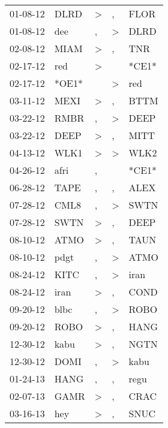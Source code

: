 \begin{supertabular}{lllll}
 01-08-12 &   DLRD &     \textgreater &                , &   FLOR \\
 01-08-12 &    dee &                , &     \textgreater &   DLRD \\
 02-08-12 &   MIAM &     \textgreater &                , &    TNR \\
 02-17-12 &    red &     \textgreater &                  &  *CE1* \\
 02-17-12 &  *OE1* &                  &     \textgreater &    red \\
 03-11-12 &   MEXI &     \textgreater &                , &   BTTM \\
 03-22-12 &   RMBR &                , &     \textgreater &   DEEP \\
 03-22-12 &   DEEP &     \textgreater &                , &   MITT \\
 04-13-12 &   WLK1 &     \textgreater &     \textgreater &   WLK2 \\
 04-26-12 &   afri &                , &                  &  *CE1* \\
 06-28-12 &   TAPE &                , &                , &   ALEX \\
 07-28-12 &   CML8 &                , &     \textgreater &   SWTN \\
 07-28-12 &   SWTN &     \textgreater &                , &   DEEP \\
 08-10-12 &   ATMO &     \textgreater &                , &   TAUN \\
 08-10-12 &   pdgt &                , &     \textgreater &   ATMO \\
 08-24-12 &   KITC &                , &     \textgreater &   iran \\
 08-24-12 &   iran &     \textgreater &                , &   COND \\
 09-20-12 &   blbc &                , &     \textgreater &   ROBO \\
 09-20-12 &   ROBO &     \textgreater &                , &   HANG \\
 12-30-12 &   kabu &     \textgreater &                , &   NGTN \\
 12-30-12 &   DOMI &                , &     \textgreater &   kabu \\
 01-24-13 &   HANG &                , &                , &   regu \\
 02-07-13 &   GAMR &     \textgreater &                , &   CRAC \\
 03-16-13 &    hey &     \textgreater &                , &   SNUC \\

\end{supertabular}

